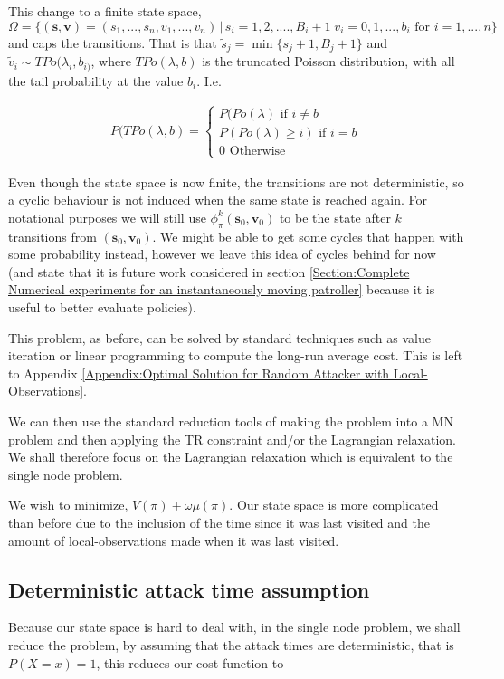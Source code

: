 \documentclass[a4paper,10pt]{article}
\theoremstyle{definition}
\theoremstyle{definition}
\theoremstyle{remark}
\theoremstyle{definition}
\begin{document}
This change to a finite state space, $\Omega = \{ (\bm{s},\bm{v})=(s_{1},...,s_{n},v_{1},...,v_{n}) \, | \, s_{i}=1,2,....,B_{i}+1 \; v_{i}=0,1,...,b_{i}  \text{ for } i=1,...,n\}$ and caps the transitions. That is that $\widetilde{s}_{j}= \min \{s_{j}+1, B_{j}+1 \}$ and $\widetilde{v}_{i} \sim TPo(\lambda_{i},b_{i)}$, where $TPo(\lambda,b)$ is the truncated Poisson distribution, with all the tail probability at the value $b_{i}$. I.e.

\begin{align*}
P(TPo(\lambda,b)=\begin{cases}
P(Po(\lambda) \text{ if } i \neq b \\
P(Po(\lambda) \geq i) \text{ if } i=b \\
0 \text{ Otherwise}
\end{cases}
\end{align*}

Even though the state space is now finite, the transitions are not deterministic, so a cyclic behaviour is not induced when the same state is reached again. For notational purposes we will still use $\phi^{k}_{\pi}(\bm{s}_{0},\bm{v}_{0})$ to be the state after $k$ transitions from $(\bm{s}_{0},\bm{v}_{0})$. We might be able to get some cycles that happen with some probability instead, however we leave this idea of cycles behind for now (and state that it is future work considered in section \ref{Section:Complete Numerical experiments for an instantaneously moving patroller} because it is useful to better evaluate policies).

This problem, as before, can be solved by standard techniques such as value iteration or linear programming to compute the long-run average cost. This is left to Appendix \ref{Appendix:Optimal Solution for Random Attacker with Local-Observations}.

We can then use the standard reduction tools of making the problem into a MN problem and then applying the TR constraint and/or the Lagrangian relaxation. We shall therefore focus on the Lagrangian relaxation which is equivalent to the single node problem.

We wish to minimize, $V(\pi)+\omega \mu(\pi)$. Our state space is more complicated than before due to the inclusion of the time since it was last visited and the amount of local-observations made when it was last visited.

\subsection{Deterministic attack time assumption}
\label{Section:Deterministic attack time assumption}
Because our state space is hard to deal with, in the single node problem, we shall reduce the problem, by assuming that the attack times are deterministic, that is $P(X=x)=1$, this reduces our cost function to
\end{document}
